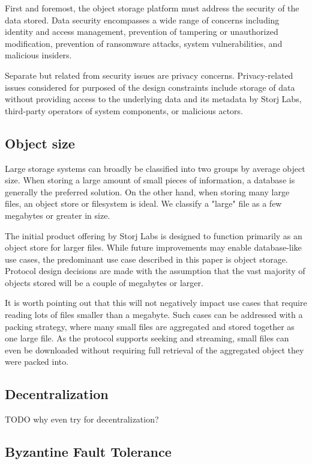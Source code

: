 \documentclass[a4paper,10pt]{article} \usepackage[utf8]{inputenc}
\newcommand{\todo}[1]{{\color{red} TODO #1 }}
\begin{document}
First and foremost, the object storage platform must address the security of
the data stored. Data security encompasses a wide range of concerns including
identity and access management, prevention of tampering or unauthorized
modification, prevention of ransomware attacks, system vulnerabilities, and
malicious insiders.

Separate but related from security issues are privacy concerns.
Privacy-related issues considered for purposed of the design constraints
include storage of data without providing access to the underlying data and its
metadata by Storj Labs, third-party operators of system components,
or malicious actors.

\subsection{Object size}

Large storage systems can broadly be classified into two groups by average
object size. When storing a large amount of small pieces of information, a
database is generally the preferred solution.
On the other hand, when storing many large
files, an object store or filesystem is ideal. We classify a "large" file as a
few megabytes or greater in size.

The initial product offering by Storj Labs is designed to function primarily as
an object store for larger files. While future improvements may enable
database-like use cases, the predominant use case described in this paper is
object storage. Protocol design decisions are made with the assumption that the
vast majority of objects stored will be a couple of megabytes or larger.

It is worth pointing out that this will not negatively impact use cases that
require reading lots of files smaller than a megabyte. Such cases can be
addressed with a packing strategy, where many small files are aggregated and
stored together as one large file.
As the protocol supports seeking and streaming, small files can even be
downloaded without requiring full retrieval of the aggregated object they were
packed into.

\subsection{Decentralization}

\todo{why even try for decentralization?}

\subsection{Byzantine Fault Tolerance}
\end{document}
